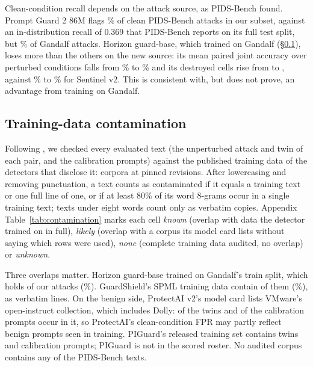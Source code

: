 \documentclass[conference]{IEEEtran}
\begin{document}
Clean-condition recall depends on the attack source, as PIDS-Bench found. Prompt Guard 2 86M flags \pidsPgTwoEightSixCleanTPR\% of clean PIDS-Bench attacks in our subset, against an in-distribution recall of 0.369 that PIDS-Bench reports on its full test split, but \pgTwoEightSixCleanTPR\% of Gandalf attacks. Horizon guard-base, which trained on Gandalf (\S\ref{sec:contamination}), loses more than the others on the new source: its mean paired joint accuracy over perturbed conditions falls from \horizonMeanPjaObf\% to \horizonMeanPjaPids\% and its destroyed cells rise from \horizonDestroyedObf{} to \horizonDestroyedPids{}, against \sentinelMeanPjaObf\% to \sentinelMeanPjaPids\% for Sentinel v2. This is consistent with, but does not prove, an advantage from training on Gandalf.

\subsection{Training-data contamination}
\label{sec:contamination}
Following \citet{liu2026passing}, we checked every evaluated text (the unperturbed attack and twin of each pair, and the calibration prompts) against the published training data of the \nAuditGuards{} detectors that disclose it: \nAuditCorpora{} corpora at pinned revisions. After lowercasing and removing punctuation, a text counts as contaminated if it equals a training text or one full line of one, or if at least 80\% of its word 8-grams occur in a single training text; texts under eight words count only as verbatim copies. Appendix Table~\ref{tab:contamination} marks each cell \emph{known} (overlap with data the detector trained on in full), \emph{likely} (overlap with a corpus its model card lists without saying which rows were used), \emph{none} (complete training data audited, no overlap) or \emph{unknown}.

Three overlaps matter. Horizon guard-base trained on Gandalf's train split, which holds \horizonContamAttacks{} of our \nPairs{} attacks (\horizonContamAttacksPct\%). GuardShield's SPML training data contain \gsContamAttacks{} of them (\gsContamAttacksPct\%), \gsContamAttacksVerbatim{} as verbatim lines. On the benign side, ProtectAI v2's model card lists VMware's open-instruct collection, which includes Dolly: \protectaiContamTwins{} of the \nPairs{} twins and \protectaiContamCal{} of the \nCalibration{} calibration prompts occur in it, so ProtectAI's clean-condition FPR may partly reflect benign prompts seen in training. PIGuard's released training set contains \piguardContamTwins{} twins and \piguardContamCal{} calibration prompts; PIGuard is not in the scored roster. No audited corpus contains any of the \pidsAuditTexts{} PIDS-Bench texts.
\end{document}
